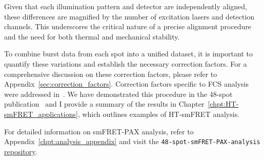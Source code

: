 Given that each illumination pattern and detector are independently aligned, these differences are magnified by the number of excitation lasers and detection channels. 
This underscores the critical nature of a precise alignment procedure and the need for both thermal and mechanical stability.

To combine burst data from each spot into a unified dataset, it is important to quantify these variations and establish the necessary correction factors. 
For a comprehensive discussion on these correction factors, please refer to Appendix~\ref{sec:correction_factors}. 
Correction factors specific to \ac{FCS} analysis were addressed in~\cite{colyer_BOE_2010}. 
We have demonstrated this procedure in the 48-spot publication~\cite{ingargiola_JCP_2018} and I provide a summary of the results in Chapter~\ref{chpt:HT-smFRET_applications}, which outlines examples of \ac{HT-smFRET} analysis.

For detailed information on smFRET-PAX analysis, refer to Appendix~\ref{chpt:analysis_appendix} and visit the \texttt{48-spot-smFRET-PAX-analysis} \href{https://github.com/tritemio/48-spot-smFRET-PAX-analysis}{repository}.

